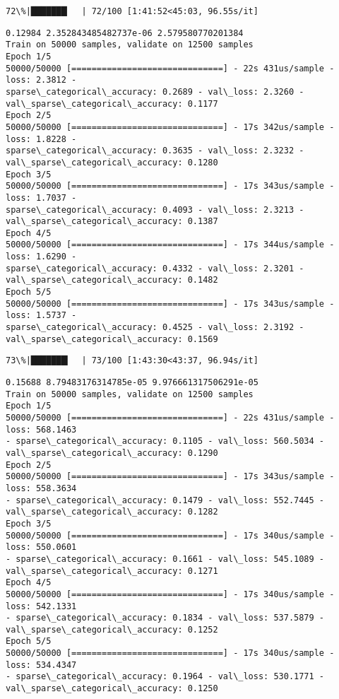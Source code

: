 \documentclass[11pt]{article}
\begin{document}
    \begin{Verbatim}[commandchars=\\\{\}]
 72\%|███████▏  | 72/100 [1:41:52<45:03, 96.55s/it]
    \end{Verbatim}

    \begin{Verbatim}[commandchars=\\\{\}]
0.12984 2.352843485482737e-06 2.579580770201384
Train on 50000 samples, validate on 12500 samples
Epoch 1/5
50000/50000 [==============================] - 22s 431us/sample - loss: 2.3812 -
sparse\_categorical\_accuracy: 0.2689 - val\_loss: 2.3260 -
val\_sparse\_categorical\_accuracy: 0.1177
Epoch 2/5
50000/50000 [==============================] - 17s 342us/sample - loss: 1.8228 -
sparse\_categorical\_accuracy: 0.3635 - val\_loss: 2.3232 -
val\_sparse\_categorical\_accuracy: 0.1280
Epoch 3/5
50000/50000 [==============================] - 17s 343us/sample - loss: 1.7037 -
sparse\_categorical\_accuracy: 0.4093 - val\_loss: 2.3213 -
val\_sparse\_categorical\_accuracy: 0.1387
Epoch 4/5
50000/50000 [==============================] - 17s 344us/sample - loss: 1.6290 -
sparse\_categorical\_accuracy: 0.4332 - val\_loss: 2.3201 -
val\_sparse\_categorical\_accuracy: 0.1482
Epoch 5/5
50000/50000 [==============================] - 17s 343us/sample - loss: 1.5737 -
sparse\_categorical\_accuracy: 0.4525 - val\_loss: 2.3192 -
val\_sparse\_categorical\_accuracy: 0.1569
    \end{Verbatim}

    \begin{Verbatim}[commandchars=\\\{\}]
 73\%|███████▎  | 73/100 [1:43:30<43:37, 96.94s/it]
    \end{Verbatim}

    \begin{Verbatim}[commandchars=\\\{\}]
0.15688 8.79483176314785e-05 9.976661317506291e-05
Train on 50000 samples, validate on 12500 samples
Epoch 1/5
50000/50000 [==============================] - 22s 431us/sample - loss: 568.1463
- sparse\_categorical\_accuracy: 0.1105 - val\_loss: 560.5034 -
val\_sparse\_categorical\_accuracy: 0.1290
Epoch 2/5
50000/50000 [==============================] - 17s 343us/sample - loss: 558.3634
- sparse\_categorical\_accuracy: 0.1479 - val\_loss: 552.7445 -
val\_sparse\_categorical\_accuracy: 0.1282
Epoch 3/5
50000/50000 [==============================] - 17s 340us/sample - loss: 550.0601
- sparse\_categorical\_accuracy: 0.1661 - val\_loss: 545.1089 -
val\_sparse\_categorical\_accuracy: 0.1271
Epoch 4/5
50000/50000 [==============================] - 17s 340us/sample - loss: 542.1331
- sparse\_categorical\_accuracy: 0.1834 - val\_loss: 537.5879 -
val\_sparse\_categorical\_accuracy: 0.1252
Epoch 5/5
50000/50000 [==============================] - 17s 340us/sample - loss: 534.4347
- sparse\_categorical\_accuracy: 0.1964 - val\_loss: 530.1771 -
val\_sparse\_categorical\_accuracy: 0.1250
    \end{Verbatim}
\end{document}

